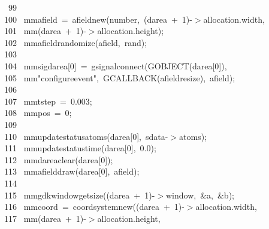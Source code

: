 \documentclass[10pt,a4paper]{article}
\newcommand{\hlstd}[1]{\textcolor[rgb]{0,0,0}{#1}}
\newcommand{\hlnum}[1]{\textcolor[rgb]{0.16,0.16,1}{#1}}
\newcommand{\hlstr}[1]{\textcolor[rgb]{1,0,0}{#1}}
\newcommand{\hlline}[1]{\textcolor[rgb]{0.33,0.33,0.33}{#1}}
\begin{document}
{}\hlline{\ \ 99\ }\hlstd{\\
}\hlline{\ 100\ }\hlstd{\hlstd{ mm}afield\ =\ afield\textunderscore new(number,\ (darea\ +\ }\hlnum{1}\hlstd{)-$>$allocation.width,\\
}\hlline{\ 101\ }\hlstd{\hlstd{ mm}(darea\ +\ }\hlnum{1}\hlstd{)-$>$allocation.height);\\
}\hlline{\ 102\ }\hlstd{\hlstd{ mm}afield\textunderscore randomize(afield,\ rand);\\
}\hlline{\ 103\ }\hlstd{\\
}\hlline{\ 104\ }\hlstd{\hlstd{ mm}sig\textunderscore darea[}\hlnum{0}\hlstd{]\ =\ g\textunderscore signal\textunderscore connect(G\textunderscore OBJECT(darea[}\hlnum{0}\hlstd{]),\\
}\hlline{\ 105\ }\hlstd{\hlstd{ mm}}\hlstr{"configure\textunderscore event"}\hlstd{,\ G\textunderscore CALLBACK(afield\textunderscore resize),\ afield);\\
}\hlline{\ 106\ }\hlstd{\\
}\hlline{\ 107\ }\hlstd{\hlstd{ mm}tstep\ =\ }\hlnum{0.003}\hlstd{;\\
}\hlline{\ 108\ }\hlstd{\hlstd{ mm}pos\ =\ }\hlnum{0}\hlstd{;\\
}\hlline{\ 109\ }\hlstd{\\
}\hlline{\ 110\ }\hlstd{\hlstd{ mm}update\textunderscore status\textunderscore atoms(darea[}\hlnum{0}\hlstd{],\ sdata-$>$atoms);\\
}\hlline{\ 111\ }\hlstd{\hlstd{ mm}update\textunderscore status\textunderscore time(darea[}\hlnum{0}\hlstd{],\ }\hlnum{0.0}\hlstd{);\\
}\hlline{\ 112\ }\hlstd{\hlstd{ mm}darea\textunderscore clear(darea[}\hlnum{0}\hlstd{]);\\
}\hlline{\ 113\ }\hlstd{\hlstd{ mm}afield\textunderscore draw(darea[}\hlnum{0}\hlstd{],\ afield);\\
}\hlline{\ 114\ }\hlstd{\\
}\hlline{\ 115\ }\hlstd{\hlstd{ mm}gdk\textunderscore window\textunderscore get\textunderscore size((darea\ +\ }\hlnum{1}\hlstd{)-$>$window,\ \&a,\ \&b);\\
}\hlline{\ 116\ }\hlstd{\hlstd{ mm}coord\ =\ coord\textunderscore system\textunderscore new((darea\ +\ }\hlnum{1}\hlstd{)-$>$allocation.width,\\
}\hlline{\ 117\ }\hlstd{\hlstd{ mm}(darea\ +\ }\hlnum{1}\hlstd{)-$>$allocation.height,\\
}
\end{document}
